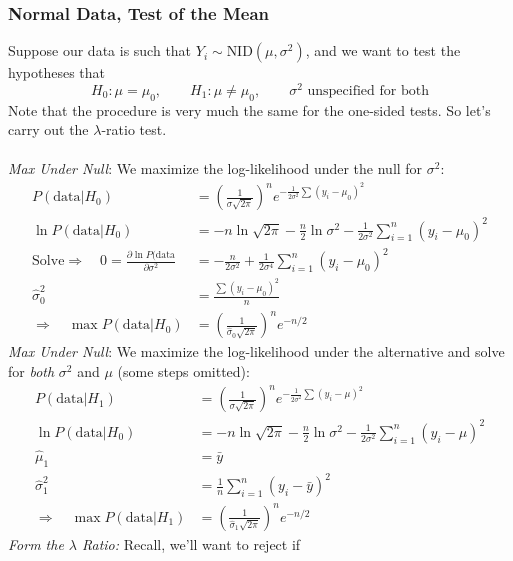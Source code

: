 \documentclass[a4paper,12pt]{scrartcl}
\begin{document}
\subsubsection{Normal Data, Test of the Mean}

Suppose our data is such that $Y_i \sim $NID$(\mu,\sigma^2)$, and 
we want to test the hypotheses that
   \[ H_0: \mu = \mu_0, \qquad H_1: \mu \neq \mu_0, \qquad 
      \text{$\sigma^2$ unspecified for both} \]
Note that the procedure is very much the same for the one-sided
tests. So let's carry out the $\lambda$-ratio test.
\\
\\
{\sl Max Under Null}: We maximize the log-likelihood under the null
for $\sigma^2$:
\begin{align*}
   P(\text{data} | H_0) &= \left(\frac{1}{\sigma\sqrt{2\pi}}\right)^n
      e^{-\frac{1}{2\sigma^2} \sum (y_i - \mu_0)^2 } \\
   \ln P(\text{data} | H_0) &= - n \ln \sqrt{2\pi}
      -\frac{n}{2} \ln \sigma^2 - \frac{1}{2\sigma^2}
      \sum_{i=1}^n (y_i - \mu_0)^2 \\
   \text{Solve} \Rightarrow \quad 0= 
      \frac{\partial \ln P(\text{data}}{\partial 
      \sigma^2} &= -\frac{n}{2\sigma^2} + \frac{1}{2\sigma^4} 
      \sum_{i=1}^n (y_i - \mu_0)^2 \\
   \hat{\sigma}^2_0 &= \frac{\sum (y_i - \mu_0)^2}{n}\\
   \Rightarrow\quad \max P(\text{data} | H_0) &= 
      \left(\frac{1}{\hat{\sigma}_0 \sqrt{2\pi}} \right)^n 
	 e^{-n/2}
\end{align*}
{\sl Max Under Null}: We maximize the log-likelihood under the 
alternative and solve for \emph{both} $\sigma^2$ and $\mu$ (some steps
omitted):
\begin{align*}
   P(\text{data} | H_1) &= \left(\frac{1}{\sigma\sqrt{2\pi}}\right)^n
      e^{-\frac{1}{2\sigma^2} \sum (y_i - \mu)^2 } \\
   \ln P(\text{data} | H_0) &= - n \ln \sqrt{2\pi}
      -\frac{n}{2} \ln \sigma^2 - \frac{1}{2\sigma^2}
      \sum_{i=1}^n (y_i - \mu)^2 \\
   \hat{\mu}_1 &= \bar{y}\\
   \hat{\sigma}^2_1 &= \frac{1}{n} \sum^n_{i=1} (y_i - \bar{y})^2\\
   \Rightarrow \quad \max P(\text{data} | H_1) &= 
      \left(\frac{1}{\hat{\sigma}_1 \sqrt{2\pi}} \right)^n
      e^{-n/2}
\end{align*}
\newpage
{\sl Form the $\lambda$ Ratio:} Recall, we'll want to reject if
\end{document}
